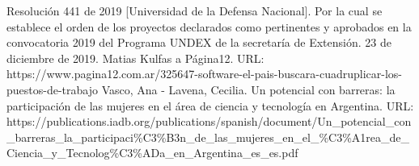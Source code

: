 \begin{thebibliography}{0}
   Resolución 441 de 2019 [Universidad de la Defensa Nacional]. Por la cual se establece el orden de los proyectos declarados como pertinentes y aprobados en la convocatoria 2019 del Programa UNDEX de la secretaría de Extensión. 23 de diciembre de 2019.
   Matias Kulfas a Página12. URL: https://www.pagina12.com.ar/325647-software-el-pais-buscara-cuadruplicar-los-puestos-de-trabajo
   Vasco, Ana - Lavena, Cecilia. Un potencial con barreras: la participación de las mujeres en el área de ciencia y tecnología en Argentina. URL: https://publications.iadb.org/publications/spanish/document/Un\_potencial\_con\_barreras\_la\_participaci\%C3\%B3n\_de\_las\_mujeres\_en\_el\_\%C3\%A1rea\_de\_Ciencia\_y\_Tecnolog\%C3\%ADa\_en\_Argentina\_es\_es.pdf
\end{thebibliography}
